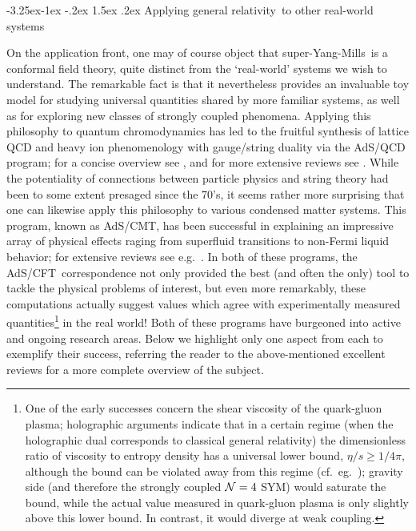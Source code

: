 \documentclass[12pt,a4paper]{article}
\makeatletter
\renewcommand\subsection{\@startsection{subsection}{2}{\z@}%
                                     {-3.25ex\@plus -1ex \@minus -.2ex}%
                                     {1.5ex \@plus .2ex}%
                                     {\normalfont\bfseries}}
\def\AC{AdS/CFT}
\def\GR{general relativity}
\def\SYM{super-Yang-Mills}
\makeatother
\begin{document}
\subsection{Applying \GR\ to other real-world systems}
\label{s:flugra}


On the application front, one may of course object that \SYM\ is a conformal field theory, quite distinct from the `real-world' systems we wish to understand.  The remarkable fact is that it nevertheless provides an invaluable toy model for studying universal quantities shared by more familiar systems, as well as for exploring new classes of strongly coupled phenomena.  Applying this philosophy to quantum chromodynamics has led to the fruitful synthesis of  lattice QCD and heavy ion phenomenology with gauge/string duality via  the AdS/QCD program; 
for a concise overview see \cite{Mateos:2007ay}, and for more extensive reviews see \cite{Gubser:2009md,CasalderreySolana:2011us}.
While the potentiality of connections between particle physics and string theory had been to some extent presaged since the 70's, it seems rather more surprising that one can likewise apply this philosophy to various condensed matter systems.  This program, known as AdS/CMT, has been successful in explaining an impressive array of physical effects raging from superfluid transitions to non-Fermi liquid behavior; for extensive reviews see e.g.\ \cite{Hartnoll:2009sz,Herzog:2009xv,McGreevy:2009xe}. 
In both of these programs, the \AC\ correspondence not only provided the best (and often the only) tool to tackle the physical problems of interest, but even more remarkably, these computations actually suggest values which agree with experimentally measured quantities\footnote{
One of the early successes concern the shear viscosity of the quark-gluon plasma;  holographic arguments  \cite{Kovtun:2004de} indicate that in a certain regime (when the holographic dual corresponds to classical general relativity) the dimensionless ratio of viscosity to entropy density has a universal lower bound, $\eta/s \ge 1/4\pi$, although the bound can be violated away from this regime (cf.\ eg.\
\cite{Kats:2007mq});
gravity side (and therefore the strongly coupled ${\cal N}=4$ SYM) would saturate the bound,
while the actual value measured in quark-gluon plasma is only slightly above this lower bound. In contrast, it would diverge at weak coupling.
} in the real world! 
Both of these programs have burgeoned into active and ongoing research areas.  Below we highlight only one aspect from each to exemplify their success, referring the reader to the above-mentioned excellent reviews for a more complete overview of the subject.
\end{document}

